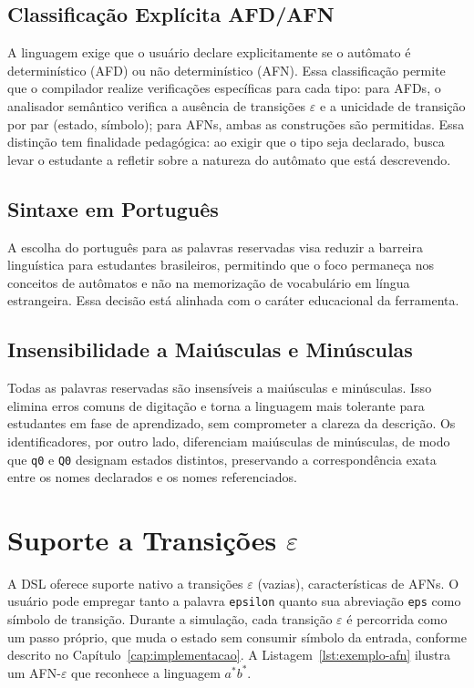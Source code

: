 \documentclass[
    12pt
    ,oneside
    ,a4paper
    ,chapter=TITLE
    ,section=TITLE
    ,sumario=abnt-6027-2012]{abntex2}
\begin{document}
\subsection{Classificação Explícita AFD/AFN}
\label{sec:dsl-classificacao}

A linguagem exige que o usuário declare explicitamente se o autômato é
determinístico (AFD) ou não determinístico (AFN). Essa classificação permite que
o compilador realize verificações específicas para cada tipo: para AFDs, o
analisador semântico verifica a ausência de transições $\varepsilon$ e a unicidade
de transição por par (estado, símbolo); para AFNs, ambas as construções são
permitidas. Essa distinção tem finalidade pedagógica: ao exigir que o tipo seja
declarado, busca levar o estudante a refletir sobre a natureza do autômato que está
descrevendo.

\subsection{Sintaxe em Português}
\label{sec:dsl-portugues}

A escolha do português para as palavras reservadas visa reduzir a barreira
linguística para estudantes brasileiros, permitindo que o foco permaneça nos
conceitos de autômatos e não na memorização de vocabulário em língua estrangeira.
Essa decisão está alinhada com o caráter educacional da ferramenta.

\subsection{Insensibilidade a Maiúsculas e Minúsculas}
\label{sec:dsl-case}

Todas as palavras reservadas são insensíveis a maiúsculas e minúsculas. Isso
elimina erros comuns de digitação e torna a linguagem mais tolerante para
estudantes em fase de aprendizado, sem comprometer a clareza da descrição. Os
identificadores, por outro lado, diferenciam maiúsculas de minúsculas, de modo
que \texttt{q0} e \texttt{Q0} designam estados distintos, preservando a
correspondência exata entre os nomes declarados e os nomes referenciados.

\section{Suporte a Transições \texorpdfstring{$\varepsilon$}{epsilon}}
\label{sec:dsl-epsilon}

A DSL oferece suporte nativo a transições $\varepsilon$ (vazias), características
de AFNs. O usuário pode empregar tanto a palavra \texttt{epsilon} quanto sua
abreviação \texttt{eps} como símbolo de transição. Durante a simulação, cada transição
$\varepsilon$ é percorrida como um passo próprio, que muda o estado sem consumir símbolo
da entrada, conforme descrito no Capítulo~\ref{cap:implementacao}. A Listagem~\ref{lst:exemplo-afn} ilustra um
AFN-$\varepsilon$ que reconhece a linguagem $a^*b^*$.
\end{document}
